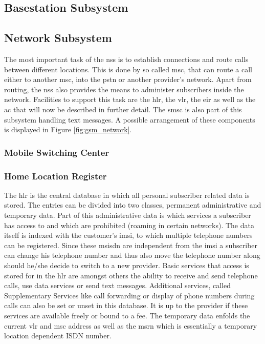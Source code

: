 \subsection{Basestation Subsystem}
\label{sec:bss}

\subsection{Network Subsystem}
\label{sec:nss}
The most important task of the \gls{nss} is to establish connections and route calls between different locations.
This is done by so called \gls{msc}, that can route a call either to another \gls{msc}, into the \gls{pstn} or another provider's network.
Apart from routing, the \gls{nss} also provides the means to administer subscribers inside the network.
Facilities to support this task are the \gls{hlr}, the \gls{vlr}, the \gls{eir} as well as the \gls{ac} that will now be described in further detail.
The \gls{smsc} is also part of this subsystem handling text messages.
A possible arrangement of these components is displayed in Figure \ref{fig:gsm_network}.

\subsubsection{Mobile Switching Center}


\subsubsection{Home Location Register}
The \gls{hlr} is the central database in which all personal subscriber related data is stored.
The entries can be divided into two classes, permanent administrative and temporary data.
Part of this administrative data is which services a subscriber has access to and which are prohibited (\eg roaming in certain networks).
The data itself is indexed with the customer's \gls{imsi}, to which multiple telephone numbers can be registered.
Since these \gls{msisdn} are independent from the \gls{imsi} a subscriber can change his telephone number and thus also move the telephone number along should he/she decide to switch to a new provider.
Basic services that access is stored for in the \gls{hlr} are amongst others the ability to receive and send telephone calls, use data services or send text messages.
Additional services, called Supplementary Services like call forwarding or display of phone numbers during calls can also be set or unset in this database.
It is up to the provider if these services are available freely or bound to a fee.
The temporary data enfolds the current \gls{vlr} and \gls{msc} address as well as the \gls{msrn} which is essentially a temporary location dependent ISDN number.

